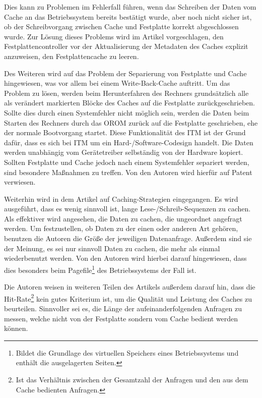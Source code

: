 Dies kann zu Problemen im Fehlerfall führen, wenn das Schreiben der Daten vom Cache an das Betriebssystem bereits bestätigt wurde, aber noch nicht sicher ist,
ob der Schreibvorgang zwischen Cache und Festplatte korrekt abgeschlossen wurde. Zur Lösung dieses Problems wird im Artikel vorgeschlagen, den Festplattencontroller
vor der Aktualisierung der Metadaten des Caches explizit anzuweisen, den Festplattencache zu leeren.

Des Weiteren wird auf das Problem der Separierung von Festplatte und Cache hingewiesen, was vor allem bei einem Write-Back-Cache auftritt. Um das
Problem zu lösen, werden beim Herunterfahren des Rechners grundsätzlich alle als verändert markierten Blöcke des Caches auf die Festplatte zurückgeschrieben.
Sollte dies durch einen Systemfehler nicht möglich sein, werden die Daten beim Starten des Rechners durch das OROM zurück auf die Festplatte geschrieben, ehe der
normale Bootvorgang startet. Diese Funktionalität des \ac{ITM} ist der Grund dafür, dass es sich bei \ac{ITM} um ein Hard-/Software-Codesign handelt. Die Daten
werden unabhängig vom Gerätetreiber selbständig von der Hardware kopiert. Sollten Festplatte und Cache jedoch nach einem Systemfehler separiert werden, sind
besondere Maßnahmen zu treffen. Von den Autoren wird hierfür auf Patent~\cite{patent:20070233947} verwiesen.

Weiterhin wird in dem Artikel auf Caching-Strategien eingegangen. Es wird ausgeführt, dass es wenig sinnvoll ist, lange Lese-/Schreib-Sequenzen zu cachen. Als
effektiver wird angesehen, die Daten zu cachen, die ungeordnet angefragt werden. Um festzustellen, ob Daten zu der einen oder anderen Art gehören, benutzen die
Autoren die Größe der jeweiligen Datenanfrage. Außerdem sind sie der Meinung, es sei nur sinnvoll Daten zu cachen, die mehr als einmal wiederbenutzt werden. Von
den Autoren wird hierbei darauf hingewiesen, dass dies besonders beim Pagefile\footnote{Bildet die Grundlage des virtuellen Speichers eines
Betriebssystems und enthält die ausgelagerten Seiten.} des Betriebssystems der Fall ist.

Die Autoren weisen in weiteren Teilen des Artikels außerdem darauf hin, dass die Hit-Rate\footnote{Ist das Verhältnis zwischen der Gesamtzahl der Anfragen
und den aus dem Cache bedienten Anfragen.} kein gutes Kriterium ist, um die Qualität und Leistung des Caches zu beurteilen. Sinnvoller sei es, die Länge der
aufeinanderfolgenden Anfragen zu messen, welche nicht von der Festplatte sondern vom Cache bedient werden können.

